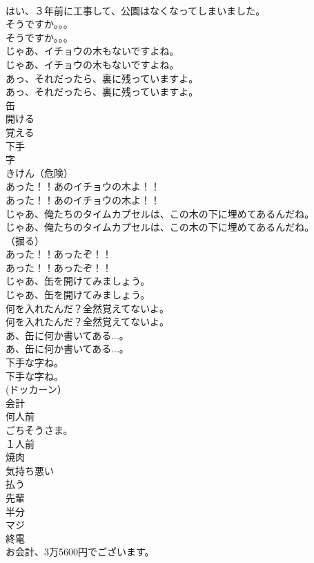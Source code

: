 \documentclass[8pt]{extreport}
\begin{document}
\begin{CJK}{UTF8}{min}
\\	はい、３年前に工事して、公園はなくなってしまいました。 
\\	そうですか。。。	
\\	そうですか。。。 
\\	じゃあ、イチョウの木もないですよね。	
\\	じゃあ、イチョウの木もないですよね。 
\\	あっ、それだったら、裏に残っていますよ。	
\\	あっ、それだったら、裏に残っていますよ。 
\\	缶
\\	開ける
\\	覚える
\\	下手
\\	字
\\	きけん（危険）
\\	あった！！あのイチョウの木よ！！	
\\	あった！！あのイチョウの木よ！！ 
\\	じゃあ、俺たちのタイムカプセルは、この木の下に埋めてあるんだね。	
\\	じゃあ、俺たちのタイムカプセルは、この木の下に埋めてあるんだね。 
\\	（掘る）	
\\	あった！！あったぞ！！	
\\	あった！！あったぞ！！ 
\\	じゃあ、缶を開けてみましょう。	
\\	じゃあ、缶を開けてみましょう。 
\\	何を入れたんだ？全然覚えてないよ。	
\\	何を入れたんだ？全然覚えてないよ。 
\\	あ、缶に何か書いてある...。	
\\	あ、缶に何か書いてある...。 
\\	下手な字ね。	
\\	下手な字ね。 
\\	(ドッカーン）	
\\	会計
\\	何人前
\\	ごちそうさま。
\\	１人前
\\	焼肉
\\	気持ち悪い
\\	払う
\\	先輩
\\	半分
\\	マジ
\\	終電
\\	お会計、3万5600円でございます。	

\end{CJK}
\end{document}
